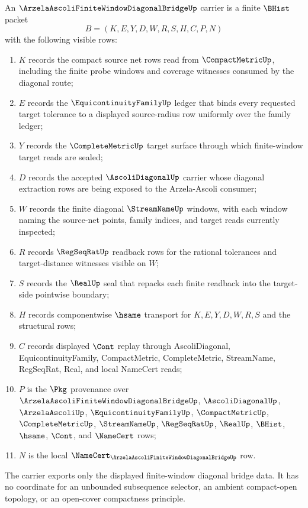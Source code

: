 \begin{definition}
\label{def:arzela-ascoli-finite-window-diagonal-bridge}
An $\ArzelaAscoliFiniteWindowDiagonalBridgeUp$ carrier is a finite $\BHist$
packet
$$
B=(K,E,Y,D,W,R,S,H,C,P,N)
$$
with the following visible rows:
\begin{enumerate}
\item $K$ records the compact source net rows read from $\CompactMetricUp$,
including the finite probe windows and coverage witnesses consumed by the
diagonal route;
\item $E$ records the $\EquicontinuityFamilyUp$ ledger that binds every
requested target tolerance to a displayed source-radius row uniformly over the
family ledger;
\item $Y$ records the $\CompleteMetricUp$ target surface through which
finite-window target reads are sealed;
\item $D$ records the accepted $\AscoliDiagonalUp$ carrier whose diagonal
extraction rows are being exposed to the Arzela-Ascoli consumer;
\item $W$ records the finite diagonal $\StreamNameUp$ windows, with each
window naming the source-net points, family indices, and target reads currently
inspected;
\item $R$ records $\RegSeqRatUp$ readback rows for the rational tolerances and
target-distance witnesses visible on $W$;
\item $S$ records the $\RealUp$ seal that repacks each finite readback into the
target-side pointwise boundary;
\item $H$ records componentwise $\hsame$ transport for $K,E,Y,D,W,R,S$ and the
structural rows;
\item $C$ records displayed $\Cont$ replay through AscoliDiagonal,
EquicontinuityFamily, CompactMetric, CompleteMetric, StreamName, RegSeqRat,
Real, and local NameCert reads;
\item $P$ is the $\Pkg$ provenance over $\ArzelaAscoliFiniteWindowDiagonalBridgeUp$,
$\AscoliDiagonalUp$, $\ArzelaAscoliUp$, $\EquicontinuityFamilyUp$,
$\CompactMetricUp$, $\CompleteMetricUp$, $\StreamNameUp$, $\RegSeqRatUp$,
$\RealUp$, $\BHist$, $\hsame$, $\Cont$, and $\NameCert$ rows;
\item $N$ is the local $\NameCert_{\ArzelaAscoliFiniteWindowDiagonalBridgeUp}$
row.
\end{enumerate}
The carrier exports only the displayed finite-window diagonal bridge data. It
has no coordinate for an unbounded subsequence selector, an ambient
compact-open topology, or an open-cover compactness principle.
\end{definition}

